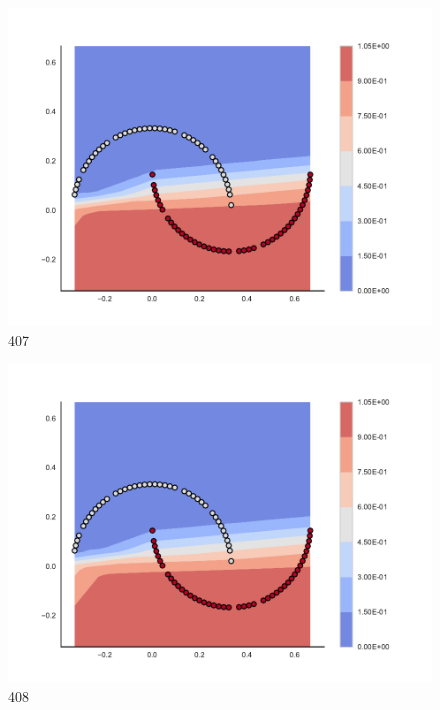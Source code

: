 \begin{subfigure}[b]{0.09\textwidth}
    \includegraphics[clip, trim=2.35cm 1.75cm 4.5cm 0cm,width=\textwidth]{img/convergence/407.pdf}
    \caption{407}
    \label{fig:convergence_407}
\end{subfigure}
%
\begin{subfigure}[b]{0.09\textwidth}
    \includegraphics[clip, trim=2.35cm 1.75cm 4.5cm 0cm,width=\textwidth]{img/convergence/408.pdf}
    \caption{408}
    \label{fig:convergence_408}
\end{subfigure}
%
